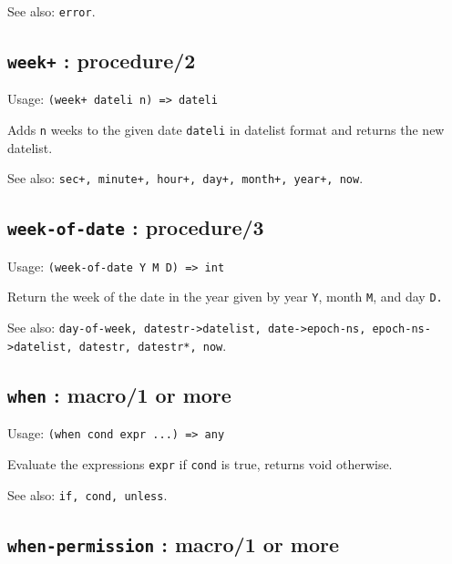 \documentclass[
]{article}
\newcommand{\passthrough}[1]{#1}
\begin{document}
See also: \passthrough{\lstinline!error!}.

\hypertarget{week-procedure2-1}{%
\subsection{\texorpdfstring{\texttt{week+} :
procedure/2}{week+ : procedure/2}}\label{week-procedure2-1}}

Usage: \passthrough{\lstinline!(week+ dateli n) => dateli!}

Adds \passthrough{\lstinline!n!} weeks to the given date
\passthrough{\lstinline!dateli!} in datelist format and returns the new
datelist.

See also:
\passthrough{\lstinline!sec+, minute+, hour+, day+, month+, year+, now!}.

\hypertarget{week-of-date-procedure3-1}{%
\subsection{\texorpdfstring{\texttt{week-of-date} :
procedure/3}{week-of-date : procedure/3}}\label{week-of-date-procedure3-1}}

Usage: \passthrough{\lstinline!(week-of-date Y M D) => int!}

Return the week of the date in the year given by year
\passthrough{\lstinline!Y!}, month \passthrough{\lstinline!M!}, and day
\passthrough{\lstinline!D.!}

See also:
\passthrough{\lstinline!day-of-week, datestr->datelist, date->epoch-ns, epoch-ns->datelist, datestr, datestr*, now!}.

\hypertarget{when-macro1-or-more-1}{%
\subsection{\texorpdfstring{\texttt{when} : macro/1 or
more}{when : macro/1 or more}}\label{when-macro1-or-more-1}}

Usage: \passthrough{\lstinline!(when cond expr ...) => any!}

Evaluate the expressions \passthrough{\lstinline!expr!} if
\passthrough{\lstinline!cond!} is true, returns void otherwise.

See also: \passthrough{\lstinline!if, cond, unless!}.

\hypertarget{when-permission-macro1-or-more-1}{%
\subsection{\texorpdfstring{\texttt{when-permission} : macro/1 or
more}{when-permission : macro/1 or more}}\label{when-permission-macro1-or-more-1}}
\end{document}
